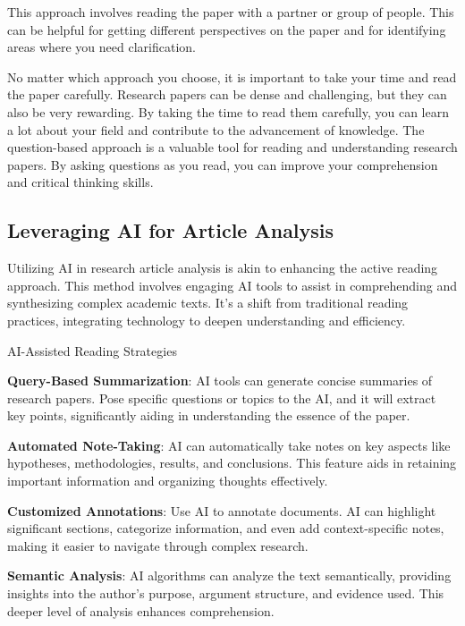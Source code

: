 \documentclass[
]{book}
\begin{document}
This approach involves reading the paper with a partner or group of people. This can be helpful for getting different perspectives on the paper and for identifying areas where you need clarification.

No matter which approach you choose, it is important to take your time and read the paper carefully. Research papers can be dense and challenging, but they can also be very rewarding. By taking the time to read them carefully, you can learn a lot about your field and contribute to the advancement of knowledge. The question-based approach is a valuable tool for reading and understanding research papers. By asking questions as you read, you can improve your comprehension and critical thinking skills.

\hypertarget{leveraging-ai-for-article-analysis}{%
\subsection*{Leveraging AI for Article Analysis}\label{leveraging-ai-for-article-analysis}}

Utilizing AI in research article analysis is akin to enhancing the active reading approach. This method involves engaging AI tools to assist in comprehending and synthesizing complex academic texts. It's a shift from traditional reading practices, integrating technology to deepen understanding and efficiency.

AI-Assisted Reading Strategies

\textbf{Query-Based Summarization}: AI tools can generate concise summaries of research papers. Pose specific questions or topics to the AI, and it will extract key points, significantly aiding in understanding the essence of the paper.

\textbf{Automated Note-Taking}: AI can automatically take notes on key aspects like hypotheses, methodologies, results, and conclusions. This feature aids in retaining important information and organizing thoughts effectively.

\textbf{Customized Annotations}: Use AI to annotate documents. AI can highlight significant sections, categorize information, and even add context-specific notes, making it easier to navigate through complex research.

\textbf{Semantic Analysis}: AI algorithms can analyze the text semantically, providing insights into the author's purpose, argument structure, and evidence used. This deeper level of analysis enhances comprehension.
\end{document}
